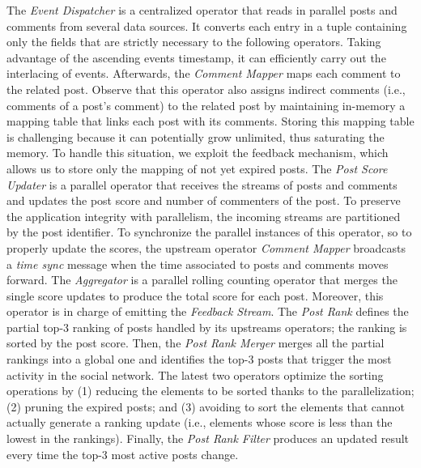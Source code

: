 The \textit{Event Dispatcher} is a centralized operator that reads in parallel posts and comments from several data sources. It converts each entry in a tuple containing only the fields that are strictly necessary to the following operators. Taking advantage of the ascending events timestamp, it can efficiently carry out the interlacing of events. 
%
Afterwards, the \textit{Comment Mapper} maps each comment to the related post. 
%
Observe that this operator also assigns indirect comments (i.e., comments of a post's comment) to the related post by maintaining in-memory a mapping table that links each post with its comments.
%
Storing this mapping table is challenging because it can potentially grow unlimited, thus saturating the memory. 
%
To handle this situation, we exploit the feedback mechanism, which allows us to store only the mapping of not yet expired posts.
%
The \textit{Post Score Updater} is a parallel operator that receives the streams of posts and comments and updates the post score and number of commenters of the post. 
To preserve the application integrity with parallelism, the incoming streams are partitioned by the post identifier.
%
To synchronize the parallel instances of this operator, so to properly update the scores, the upstream operator \textit{Comment Mapper} broadcasts a \textit{time sync} message when the time associated to posts and comments moves forward.
%
The \textit{Aggregator} is a parallel rolling counting operator that merges the single score updates to produce the total score for each post. 
%
Moreover, this operator is in charge of emitting the \textit{Feedback Stream}.
%
The \textit{Post Rank} defines the partial top-3 ranking of posts handled by its upstreams operators; the ranking is sorted by the post score. 
%
Then, the \textit{Post Rank Merger} merges all the partial rankings into a global one and identifies the top-3 posts that trigger the most activity in the social network. 
%
The latest two operators optimize the sorting operations by
%
(1) reducing the elements to be sorted thanks to the parallelization;
%
(2) pruning the expired posts; and 
%
(3) avoiding to sort the elements that cannot actually generate a ranking update (i.e., elements whose score is less than the lowest in the rankings). 
% 
%
Finally, the \textit{Post Rank Filter} produces an updated result every time the top-3 most active posts change.



